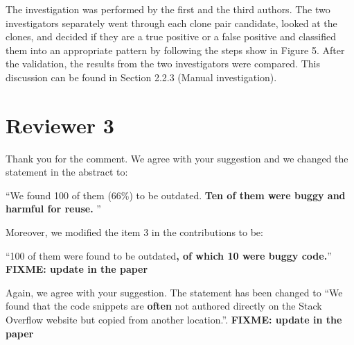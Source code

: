 \documentclass[a4paper,twoside,10pt]{reviewresponse}
\newcommand\FIXME[1]{{\color{red}\textbf{FIXME: #1}}}
\begin{document}
The investigation was performed by the first and
the third authors. The two investigators separately went through each clone pair
candidate, looked at the clones, and decided if they are a true positive or a
false positive and classified them into an appropriate pattern by following the steps show in Figure 5. 
After the validation, the results from the two investigators were compared. 
This discussion can be found in Section 2.2.3 (Manual investigation).

\section{Reviewer 3}


Thank you for the comment. We agree with your suggestion and we changed the statement in the abstract to:

``We found 100 of them (66\%) to be outdated. \textbf{Ten of them were buggy and harmful for reuse.} ''

Moreover, we modified the item 3 in the contributions to be:

``100 of them were found to be outdated\textbf{, of which 10 were buggy code.}'' \FIXME{update in the paper}


Again, we agree with your suggestion. The statement has been changed to ``We found that the code snippets are \textbf{often} not authored directly on the Stack Overflow website but copied from another location.''. \FIXME{update in the paper}
\end{document}
